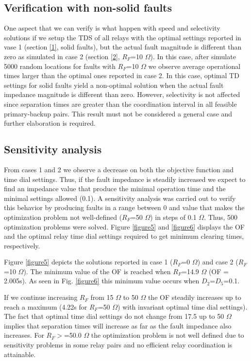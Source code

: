 \documentclass[letterpaper, 10 pt, conference]{IEEEtran}
\begin{document}
\subsection{Verification with non-solid faults}\label{s3}

One aspect that we can verify is what happen with speed and selectivity solutions if we setup the TDS of all relays with the optimal settings reported in vase 1 (section \ref{1}, solid faults), but the actual fault magnitude is different than zero as simulated in case 2 (section \ref{2}, $R_F$=10 $\Omega$). In this case, after simulate 5000 random locations for faults with $R_F$=10 $\Omega$ we observe average operational times larger than the optimal ones reported in case 2. In this case, optimal TD settings for solid faults yield a non-optimal solution when the actual fault impedance magnitude is different than zero. However, selectivity is not affected since separation times are greater than the coordination interval in all feasible primary-backup pairs. This result must not be considered a general case and further elaboration is required.

\subsection{Sensitivity analysis }\label{3}

From cases 1 and 2 we observe a decrease on both the objective function and time dial settings. Thus, if the fault impedance is steadily increased we expect to find an impedance value that produce the minimal operation time and the minimal settings allowed (0.1). A sensitivity analysis  was carried out to verify this behavior by producing faults in a range
between 0 and value that makes the optimization problem not well-defined ($R_F$=50  $\Omega$) in steps of 0.1 $\Omega$. Thus, 500 optimization problems were solved. Figure \ref{figure5} and \ref{figure6} displays the OF and the optimal relay time dial settings required to get minimum clearing times, respectively.

 Figure \ref{figure5} depicts the solutions reported in case 1 ($R_F$=0 $\Omega$) and case 2 ($R_F$=10 $\Omega$). The minimum value of the OF is reached when $R_F$=14.9 $\Omega$ (OF = 2.005s). As seen in Fig.  \ref{figure6} this minimum value occurs when $D_2$=$D_5$=0.1.

  If we continue increasing $R_F$ from 15 $\Omega$ to 50 $\Omega$ the OF  steadily increases up to reach a maximum (4.22s for $R_F$=50  $\Omega$) with invariant optimal time dial settings). The fact that optimal time dial settings do not change from 17.5 up to 50 $\Omega$  implies that separation times will increase as far as the fault impedance also increases.  For $R_F>$=50.0  $\Omega$ the optimization problem is not well defined due to sensitivity problems in some relay pairs and no efficient relay coordination is attainable.
\end{document}
